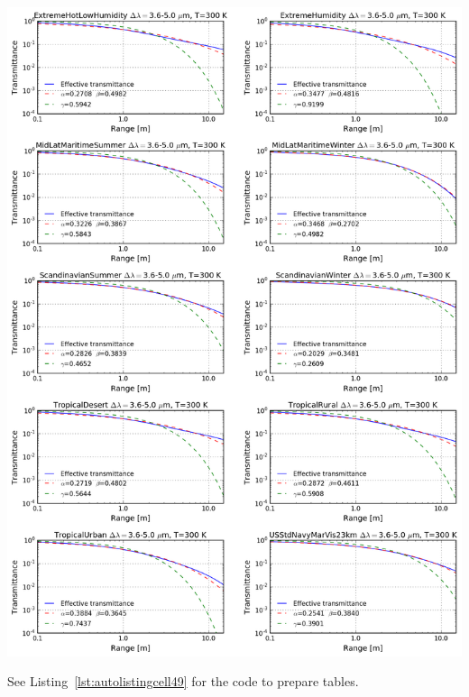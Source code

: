 \documentclass{workpackage}
\begin{document}
\begin{center}
\includegraphics{./pic/Analyse-Standard-Atmospheres_48_0.png}
\end{center}



See Listing~\ref{lst:autolistingcell49} for the code to prepare tables.
\end{document}
